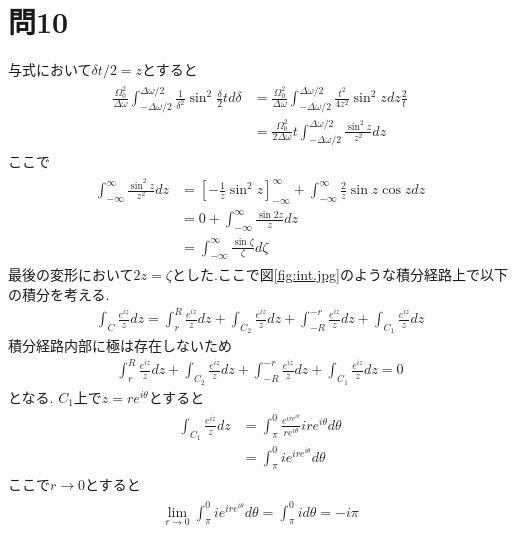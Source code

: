 \documentclass[uplatex,a4j,11pt,dvipdfmx]{jsarticle}
\begin{document}
\section*{問10}
与式において$\delta t/2=z$とすると
\begin{align}
  \begin{split}
    \frac{\Omega_0^2}{\Delta\omega}\int_{-\Delta\omega/2}^{\Delta\omega/2}\frac{1}{\delta^2}\sin^2\frac{\delta}{2}td\delta&=\frac{\Omega_0^2}{\Delta\omega}\int_{-\Delta\omega/2}^{\Delta\omega/2}\frac{t^2}{4z^2}\sin^2zdz\frac{2}{t}\\
    &=\frac{\Omega_0^2}{2\Delta\omega}t\int_{-\Delta\omega/2}^{\Delta\omega/2}\frac{\sin^2z}{z^2}dz
  \end{split}
\end{align}
ここで
\begin{align}
  \begin{split}
    \int_{-\infty}^\infty\frac{\sin^2z}{z^2}dz&=\left[-\frac{1}{z}\sin^2z\right]_{-\infty}^\infty+\int_{-\infty}^\infty\frac{2}{z}\sin z\cos zdz\\
    &=0+\int_{-\infty}^\infty\frac{\sin 2z}{z}dz\\
    &=\int_{-\infty}^\infty\frac{\sin \zeta}{\zeta}d\zeta
  \end{split}
\end{align}
最後の変形において$2z=\zeta$とした.ここで図\ref{fig:int.jpg}のような積分経路上で以下の積分を考える.
\begin{align}
  \int_C\frac{e^{iz}}{z}dz=\int_r^R\frac{e^{iz}}{z}dz+\int_{C_2}\frac{e^{iz}}{z}dz+\int_{-R}^{-r}\frac{e^{iz}}{z}dz+\int_{C_1}\frac{e^{iz}}{z}dz
\end{align}
積分経路内部に極は存在しないため
\begin{align}
  \int_r^R\frac{e^{iz}}{z}dz+\int_{C_2}\frac{e^{iz}}{z}dz+\int_{-R}^{-r}\frac{e^{iz}}{z}dz+\int_{C_1}\frac{e^{iz}}{z}dz=0
\end{align}
となる.
$C_1$上で$z=re^{i\theta}$とすると
\begin{align}
  \begin{split}
    \int_{C_1}\frac{e^{iz}}{z}dz&=\int_\pi^0\frac{e^{ire^{i\theta}}}{re^{i\theta}}ire^{i\theta}d\theta\\
    &=\int_\pi^0ie^{ire^{i\theta}}d\theta
  \end{split}
\end{align}
ここで$r\rightarrow0$とすると
\begin{align}
  \begin{split}
    \lim_{r\rightarrow0}\int_\pi^0ie^{ire^{i\theta}}d\theta=\int_\pi^0id\theta=-i\pi
  \end{split}
\end{align}
\end{document}
